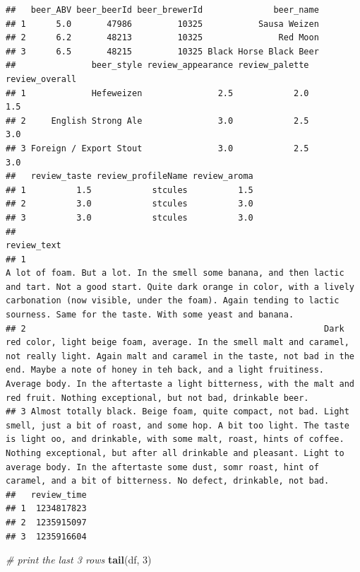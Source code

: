 \documentclass[
  a4paper,
]{article}
\newenvironment{Shaded}{\begin{snugshade}}{\end{snugshade}}
\newcommand{\CommentTok}[1]{\textcolor[rgb]{0.56,0.35,0.01}{\textit{#1}}}
\newcommand{\DecValTok}[1]{\textcolor[rgb]{0.00,0.00,0.81}{#1}}
\newcommand{\FunctionTok}[1]{\textcolor[rgb]{0.13,0.29,0.53}{\textbf{#1}}}
\newcommand{\NormalTok}[1]{#1}
\begin{document}
\begin{verbatim}
##   beer_ABV beer_beerId beer_brewerId              beer_name
## 1      5.0       47986         10325           Sausa Weizen
## 2      6.2       48213         10325               Red Moon
## 3      6.5       48215         10325 Black Horse Black Beer
##               beer_style review_appearance review_palette review_overall
## 1             Hefeweizen               2.5            2.0            1.5
## 2     English Strong Ale               3.0            2.5            3.0
## 3 Foreign / Export Stout               3.0            2.5            3.0
##   review_taste review_profileName review_aroma
## 1          1.5            stcules          1.5
## 2          3.0            stcules          3.0
## 3          3.0            stcules          3.0
##                                                                                                                                                                                                                                                                                                                                                                                                    review_text
## 1                                                                                                                                       A lot of foam. But a lot. In the smell some banana, and then lactic and tart. Not a good start. Quite dark orange in color, with a lively carbonation (now visible, under the foam). Again tending to lactic sourness. Same for the taste. With some yeast and banana.
## 2                                                           Dark red color, light beige foam, average. In the smell malt and caramel, not really light. Again malt and caramel in the taste, not bad in the end. Maybe a note of honey in teh back, and a light fruitiness. Average body. In the aftertaste a light bitterness, with the malt and red fruit. Nothing exceptional, but not bad, drinkable beer.
## 3 Almost totally black. Beige foam, quite compact, not bad. Light smell, just a bit of roast, and some hop. A bit too light. The taste is light oo, and drinkable, with some malt, roast, hints of coffee. Nothing exceptional, but after all drinkable and pleasant. Light to average body. In the aftertaste some dust, somr roast, hint of caramel, and a bit of bitterness. No defect, drinkable, not bad.
##   review_time
## 1  1234817823
## 2  1235915097
## 3  1235916604
\end{verbatim}

\begin{Shaded}
\begin{Highlighting}[]
\CommentTok{\# print the last 3 rows}
\FunctionTok{tail}\NormalTok{(df, }\DecValTok{3}\NormalTok{)}
\end{Highlighting}
\end{Shaded}
\end{document}
